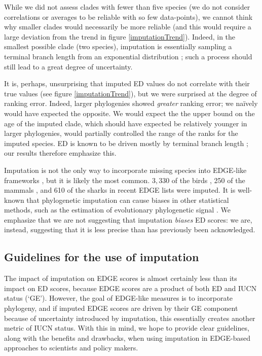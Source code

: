 \documentclass[10pt,english]{article}
\begin{document}
While we did not assess clades with fewer than five species (we do not consider
correlations or averages to be reliable with so few data-points), we cannot
think why smaller clades would necessarily be more reliable (and this would
require a large deviation from the trend in figure \ref{imputationTrend}).
Indeed, in the smallest possible clade (two species), imputation is essentially
sampling a terminal branch length from an exponential distribution
\autocite{Kuhn2011}; such a process should still lead to a great degree of
uncertainty. 

It is, perhaps, unsurprising that imputed ED values do not correlate with their
true values (see figure \ref{imputationTrend}), but we were surprised at the
degree of ranking error. Indeed, larger phylogenies showed \emph{greater}
ranking error; we na\"{i}vely would have expected the opposite. We would expect
the the upper bound on the age of the imputed clade, which should have expected
be relatively younger in larger phylogenies, would partially controlled the
range of the ranks for the imputed species. ED is known to be driven mostly by
terminal branch length \autocite{Isaac2007, Steel2007, Redding2008}; our results
therefore emphasize this.

Imputation is not the only way to incorporate missing species into EDGE-like
frameworks \autocite[see][]{Collen2011,Gumbs2018}, but it is likely the most
common. $3,330$ of the birds \autocite[\textasciitilde30\%;][]{Jetz2014}, 250 of
the mammals \autocite[\textasciitilde 5.6\%;][]{Collen2011}, and 610 of the
sharks \autocite[\textasciitilde49\%;][]{Stein2018} in recent EDGE lists were
imputed. It is well-known that phylogenetic imputation can cause biases in other
statistical methods, such as the estimation of evolutionary phylogenetic signal
\autocite{Rabosky2015}. We emphasize that we are not suggesting that imputation
\emph{biases} ED scores: we are, instead, suggesting that it is less precise
than has previously been acknowledged.

\subsection*{Guidelines for the use of imputation}
The impact of imputation on EDGE scores is almost certainly less than its impact
on ED scores, because EDGE scores are a product of both ED and IUCN status
(‘GE'). However, the goal of EDGE-like measures is to incorporate phylogeny, and
if imputed EDGE scores are driven by their GE component because of uncertainty
introduced by imputation, this essentially creates another metric of IUCN
status. With this in mind, we hope to provide clear guidelines, along
with the benefits and drawbacks, when using imputation in EDGE-based approaches
to scientists and policy makers.
\end{document}
